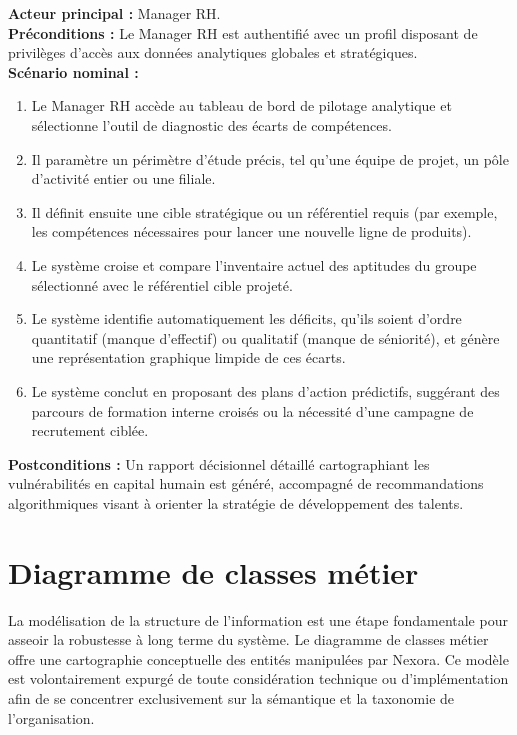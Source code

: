 \documentclass[12pt,a4paper]{article}
\begin{document}
\begin{tcolorbox}[colback=bleu!5,colframe=bleu,title=Cas d'utilisation 3 : Détection des lacunes en compétences]
\textbf{Acteur principal :} Manager RH. \\
\textbf{Préconditions :} Le Manager RH est authentifié avec un profil disposant de privilèges d'accès aux données analytiques globales et stratégiques. \\
\textbf{Scénario nominal :}
\begin{enumerate}
    \item Le Manager RH accède au tableau de bord de pilotage analytique et sélectionne l'outil de diagnostic des écarts de compétences.
    \item Il paramètre un périmètre d'étude précis, tel qu'une équipe de projet, un pôle d'activité entier ou une filiale.
    \item Il définit ensuite une cible stratégique ou un référentiel requis (par exemple, les compétences nécessaires pour lancer une nouvelle ligne de produits).
    \item Le système croise et compare l'inventaire actuel des aptitudes du groupe sélectionné avec le référentiel cible projeté.
    \item Le système identifie automatiquement les déficits, qu'ils soient d'ordre quantitatif (manque d'effectif) ou qualitatif (manque de séniorité), et génère une représentation graphique limpide de ces écarts.
    \item Le système conclut en proposant des plans d'action prédictifs, suggérant des parcours de formation interne croisés ou la nécessité d'une campagne de recrutement ciblée.
\end{enumerate}
\textbf{Postconditions :} Un rapport décisionnel détaillé cartographiant les vulnérabilités en capital humain est généré, accompagné de recommandations algorithmiques visant à orienter la stratégie de développement des talents.
\end{tcolorbox}

\section{Diagramme de classes métier}

La modélisation de la structure de l'information est une étape fondamentale pour asseoir la robustesse à long terme du système. Le diagramme de classes métier offre une cartographie conceptuelle des entités manipulées par Nexora. Ce modèle est volontairement expurgé de toute considération technique ou d'implémentation afin de se concentrer exclusivement sur la sémantique et la taxonomie de l'organisation.
\end{document}
